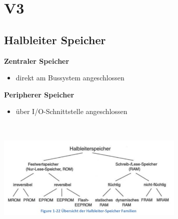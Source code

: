 \section{V3}
\vspace{-0.5cm} 
    \begin{minipage}{9cm}
        \subsection{Halbleiter Speicher} 
        \textbf{Zentraler Speicher}
        \begin{itemize}
            \item direkt am Bussystem angeschlossen
        \end{itemize}
        \textbf{Peripherer Speicher}
        \begin{itemize}
            \item über I/O-Schnittstelle angeschlossen
        \end{itemize}
    \end{minipage}
    \begin{minipage}{0.5cm}
    	\ \
    \end{minipage}
    \begin{minipage}{9cm}
    	\includegraphics[width=9cm]{images/halbleiterfam}
    \end{minipage}
 
